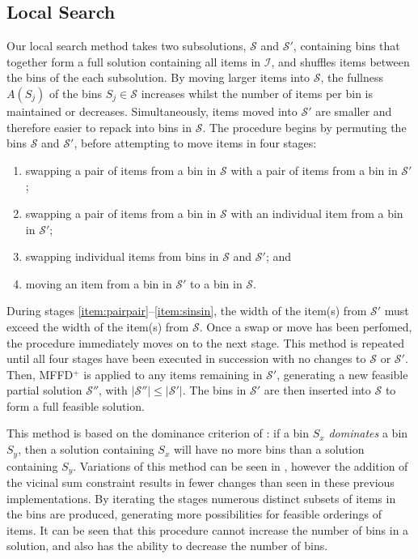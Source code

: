 \documentclass[authoryear]{elsarticle}
\begin{document}
\subsection{Local Search}
\label{sub:localsearch}
\noindent Our local search method takes two subsolutions, $\mathcal{S}$ and $\mathcal{S}'$, containing bins that together form a full solution containing all items in $\mathcal{I}$, and shuffles items between the bins of the each subsolution. By moving larger items into $\mathcal{S}$, the fullness $A(S_j)$ of the bins $S_j \in \mathcal{S}$ increases whilst the number of items per bin is maintained or decreases. Simultaneously, items moved into $\mathcal{S}'$ are smaller and therefore easier to repack into bins in $\mathcal{S}$. The procedure begins by permuting the bins $\mathcal{S}$ and $\mathcal{S}'$, before attempting to move items in four stages:
\begin{enumerate}[label={(\arabic*)},itemsep=-2pt,topsep=2pt]
	\item swapping a pair of items from a bin in $\mathcal{S}$ with a pair of items from a bin in $\mathcal{S}'$;\label{item:pairpair}
	\item swapping a pair of items from a bin in $\mathcal{S}$ with an individual item from a bin in $\mathcal{S}'$;\label{item:pairsin}
	\item swapping individual items from bins in $\mathcal{S}$ and $\mathcal{S}'$;\label{item:sinsin} and
	\item moving an item from a bin in $\mathcal{S}'$ to a bin in $\mathcal{S}$.\label{item:movesin}
\end{enumerate} 
During stages \ref{item:pairpair}--\ref{item:sinsin}, the width of the item(s) from $\mathcal{S}'$ must exceed the width of the item(s) from $\mathcal{S}$. Once a swap or move has been perfomed, the procedure immediately moves on to the next stage. This method is repeated until all four stages have been executed in succession with no changes to $\mathcal{S}$ or $\mathcal{S}'$. Then, MFFD$^+$ is applied to any items remaining in $\mathcal{S}'$, generating a new feasible partial solution $\mathcal{S}''$, with $|\mathcal{S}''| \leq |\mathcal{S}'|$. The bins in $\mathcal{S}'$ are then inserted into $\mathcal{S}$ to form a full feasible solution. 

This method is based on the dominance criterion of \citet{martello1990l}: if a bin $S_x$ \emph{dominates} a bin $S_y$, then a solution containing $S_x$ will have no more bins than a solution containing $S_y$. Variations of this method can be seen in \citet{lewis2009, lewis2017, falkenauer1996, levine2004}, however the addition of the vicinal sum constraint results in fewer changes than seen in these previous implementations. By iterating the stages numerous distinct subsets of items in the bins are produced, generating more possibilities for feasible orderings of items. It can be seen that this procedure cannot increase the number of bins in a solution, and also has the ability to decrease the number of bins.
\end{document}
